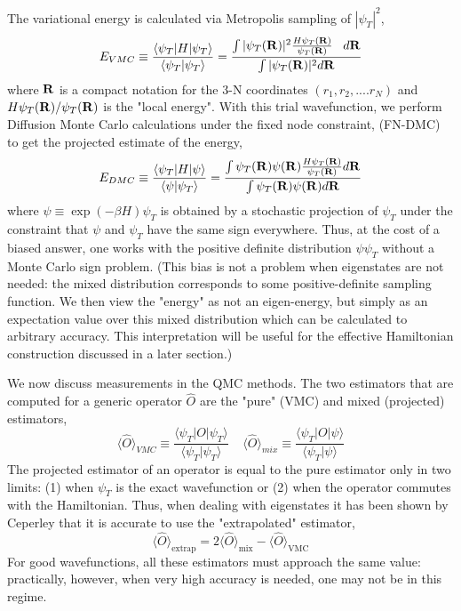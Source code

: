 \documentclass[aip,jcp,twocolumn,10pt]{revtex4-1}
\begin{document}
The variational energy is calculated via Metropolis sampling of $|\psi_T|^{2}$, 
\begin{equation} 
 E_{VMC} \equiv \frac{ \langle \psi_T | H | \psi_T \rangle} {\langle \psi_T | \psi_T \rangle} = \frac{ \int |\psi_T ({\bf{R}})|^2 \frac{H \psi_T({\bf{R}})}{\psi_T({\bf{R}})} \;\;\; d{\bf{R}} } { \int |\psi_T ({\bf{R}})|^2 d {\bf{R}}}
\end{equation}
where $\bf{R}$ is a compact notation for the 3-N 
coordinates $(r_1,r_2,....r_N)$ and $H \psi_T({\bf{R}})/\psi_T({\bf{R}})$ is the "local energy". 
With this trial wavefunction, we perform Diffusion Monte Carlo 
calculations under the fixed node constraint, (FN-DMC) 
to get the projected estimate of the energy, 
\begin{equation}
E_{DMC} \equiv \frac{ \langle \psi_T | H | \psi \rangle} {\langle \psi | \psi_T \rangle} = \frac{ \int \psi_T ({\bf{R}}) \psi({\bf{R}}) \frac{H \psi_T({\bf{R}})}{\psi_T({\bf{R}})} d {\bf{R}} }{ \int \psi_T ({\bf{R}}) \psi ({\bf{R}}) d {\bf{R}}}
\end{equation}
where $\psi \equiv \exp (-\beta H) \psi_T$ is obtained by a stochastic projection 
of $\psi_T$ under the constraint that $\psi$ and $\psi_T$ have the same sign everywhere. 
Thus, at the cost of a biased answer, one works with the positive definite 
distribution $\psi \psi_T$ without a Monte Carlo sign problem. (This bias 
is not a problem when eigenstates are not needed: the mixed distribution 
corresponds to some positive-definite sampling function.  We then view the 
"energy" as not an eigen-energy, but simply as an expectation value over this mixed distribution which can be 
calculated to arbitrary accuracy. This interpretation will be useful for the 
effective Hamiltonian construction discussed in a later section.)   

We now discuss measurements in the QMC methods. The two estimators that are computed for a generic operator $\hat{O}$ 
are the "pure" (VMC) and mixed (projected) estimators, 
\begin{equation}
         \langle \hat{O} \rangle_{VMC} \equiv \frac{ \langle \psi_T | O | \psi_T \rangle} {\langle \psi_T | \psi_T \rangle} 
\;\;\;\; \langle \hat{O} \rangle_{mix} \equiv \frac{ \langle \psi_T | O | \psi   \rangle} {\langle \psi_T | \psi\rangle}
\end{equation}
The projected estimator of an operator is equal to the pure estimator 
only in two limits: (1) when $\psi_T$ is the exact wavefunction or (2) when the 
operator commutes with the Hamiltonian. Thus, when dealing with eigenstates 
it has been shown by Ceperley that it is accurate to use the "extrapolated" 
estimator,
\begin{equation}
	\langle \hat{O} \rangle_{\text{extrap}}  = 2 \langle \hat{O} \rangle_{\text{mix}} - \langle \hat{O} \rangle_{\text{VMC}}
\end{equation}
For good wavefunctions, all these estimators must approach the same value: practically, 
however, when very high accuracy is needed, one may not be in this regime. 
\end{document}
